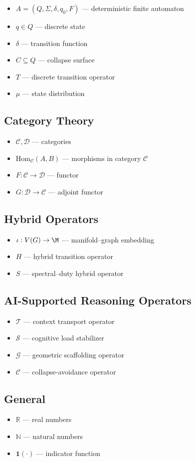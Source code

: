 \begin{itemize}[leftmargin=2em]
    \item $A = (Q,\Sigma,\delta,q_0,F)$ — deterministic finite automaton
    \item $q \in Q$ — discrete state
    \item $\delta$ — transition function
    \item $C \subseteq Q$ — collapse surface
    \item $T$ — discrete transition operator
    \item $\mu$ — state distribution
\end{itemize}

\subsection{Category Theory}

\begin{itemize}[leftmargin=2em]
    \item $\mathcal{C}, \mathcal{D}$ — categories
    \item $\mathrm{Hom}_{\mathcal{C}}(A,B)$ — morphisms in category $\mathcal{C}$
    \item $F : \mathcal{C} \to \mathcal{D}$ — functor
    \item $G : \mathcal{D} \to \mathcal{C}$ — adjoint functor
\end{itemize}

\subsection{Hybrid Operators}

\begin{itemize}[leftmargin=2em]
    \item $\iota : V(G) \to \M$ — manifold–graph embedding
    \item $H$ — hybrid transition operator
    \item $S$ — spectral–duty hybrid operator
\end{itemize}

\subsection{AI-Supported Reasoning Operators}

\begin{itemize}[leftmargin=2em]
    \item $\mathcal{T}$ — context transport operator
    \item $\mathcal{S}$ — cognitive load stabilizer
    \item $\mathcal{G}$ — geometric scaffolding operator
    \item $\mathcal{C}$ — collapse‑avoidance operator
\end{itemize}

\subsection{General}

\begin{itemize}[leftmargin=2em]
    \item $\mathbb{R}$ — real numbers
    \item $\mathbb{N}$ — natural numbers
    \item $\mathbf{1}(\cdot)$ — indicator function
\end{itemize}
